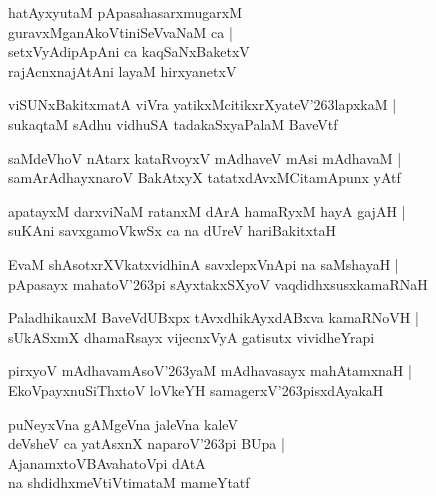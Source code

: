 \documentclass[twoside,12pt,openright]{book}
\def\S{\char'263}
\newcounter{shloka}[chapter]
\begin{document}
\begin{shloka}%
hatAyxyutaM pApasahasarxmugarxM \\
guravxMganAkoVtiniSeVvaNaM ca |\\
setxVyAdipApAni ca kaqSaNxBaketxV \\
rajAcnxnajAtAni layaM hirxyanetxV
\end{shloka}

\begin{shloka}%
viSUNxBakitxmatA viVra yatikxMcitikxrXyateV\S lapxkaM |\\
sukaqtaM sAdhu vidhuSA tadakaSxyaPalaM BaveVtf 
\end{shloka}

\begin{shloka}%
saMdeVhoV nAtarx kataRvoyxV mAdhaveV mAsi mAdhavaM |\\
samArAdhayxnaroV BakAtxyX tatatxdAvxMCitamApunx yAtf 
\end{shloka}

\begin{shloka}%
apatayxM darxviNaM ratanxM dArA hamaRyxM hayA gajAH |\\
suKAni savxgamoVkwSx ca na dUreV hariBakitxtaH 
\end{shloka}

\begin{shloka}%
EvaM shAsotxrXVkatxvidhinA savxlepxVnApi na saMshayaH |\\
pApasayx mahatoV\S pi sAyxtakxSXyoV vaqdidhxsusxkamaRNaH 
\end{shloka}

\begin{shloka}%
PaladhikauxM BaveVdUBxpx tAvxdhikAyxdABxva kamaRNoVH |\\
sUkASxmX dhamaRsayx vijecnxVyA gatisutx vividheYrapi
\end{shloka}

\begin{shloka}%
pirxyoV mAdhavamAsoV\S yaM mAdhavasayx mahAtamxnaH |\\
EkoVpayxnuSiThxtoV loVkeYH samagerxV\S pisxdAyakaH 
\end{shloka}

\begin{shloka}%
puNeyxVna gAMgeVna jaleVna kaleV \\
deVsheV ca yatAsxnX naparoV\S pi BUpa |\\
AjanamxtoVBAvahatoVpi dAtA \\
na shdidhxmeVtiVtimataM mameYtatf
\end{shloka}
\end{document}
